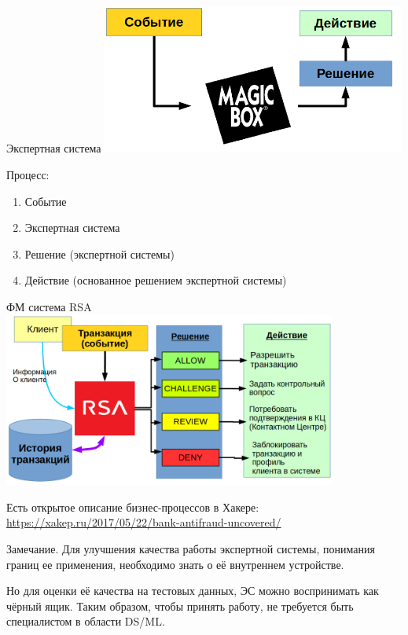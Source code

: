\documentclass{beamer}
\begin{document}
  \begin{frame}{Экспертная система}
    \includegraphics[width=10cm]{../pic/expert_system_1.png}
  
  Процесс:
  \begin{enumerate}
  	\item Событие
  	\item Экспертная система
  	\item Решение (экспертной системы)
  	\item Действие (основанное решением экспертной системы)
  \end{enumerate}
  \end{frame}

  \begin{frame}{ФМ система RSA}
   \includegraphics[width=11cm]{../pic/expert_system_rsa.png}
  
  Есть открытое описание бизнес-процессов в Хакере:
  \url{https://xakep.ru/2017/05/22/bank-antifraud-uncovered/}
  \end{frame}
  
  \begin{frame}
  	\begin{block}{Замечание.}
  		Для улучшения качества работы экспертной системы, понимания границ ее применения,
  		необходимо знать о её внутреннем устройстве.
  		
  		Но для оценки её качества на тестовых данных, ЭС можно воспринимать как чёрный ящик.
  		Таким образом, чтобы принять работу, не требуется быть специалистом в области DS/ML.
  	\end{block}
  \end{frame}
\end{document}
